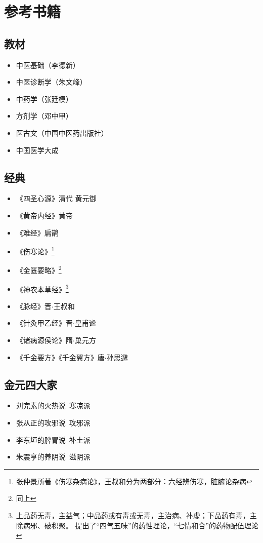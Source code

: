 \chapter{参考书籍}

\section{教材}
\begin{itemize}
  \item 中医基础（李德新）
  \item 中医诊断学（朱文峰）
  \item 中药学（张廷模）
  \item 方剂学（邓中甲）
  \item 医古文（中国中医药出版社）
  \item 中国医学大成
\end{itemize}

\section{经典}
\begin{itemize}
  \item 《四圣心源》清代 黄元御
  \item 《黄帝内经》黄帝
  \item 《难经》扁鹊
  \item 《伤寒论》\footnote{张仲景所著《伤寒杂病论》，王叔和分为两部分：六经辨伤寒，脏腑论杂病}
  \item 《金匮要略》\footnote{同上}
  \item 《神农本草经》\footnote{上品药无毒，主益气；中品药或有毒或无毒，主治病、补虚；下品药有毒，主除病邪、破积聚。
  提出了“四气五味”的药性理论，“七情和合”的药物配伍理论}
  \item 《脉经》晋$\cdot$王叔和
  \item 《针灸甲乙经》晋$\cdot$皇甫谧
  \item 《诸病源侯论》隋$\cdot$巢元方
  \item 《千金要方》《千金翼方》唐$\cdot$孙思邈
\end{itemize}

\section{金元四大家}
\begin{itemize}
  \item 刘完素的火热说\ 寒凉派
  \item 张从正的攻邪说\ 攻邪派
  \item 李东垣的脾胃说\ 补土派
  \item 朱震亨的养阴说\ 滋阴派
\end{itemize}
